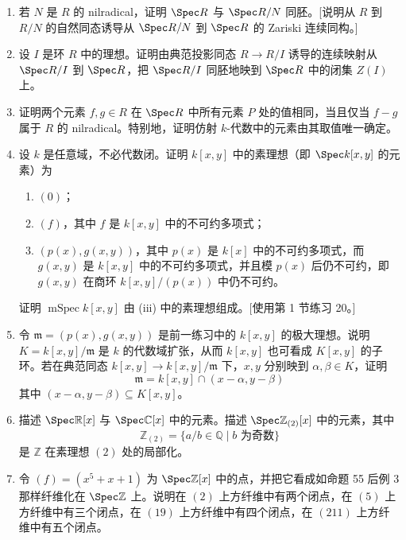 \begin{enumerate}[label=\arabic*.]
	\item 若 $N$ 是 $R$ 的 nilradical，证明 $\Spec R$ 与 $\Spec R/N$ 同胚。[说明从 $R$ 到 $R/N$ 的自然同态诱导从 $\Spec R/N$ 到 $\Spec R$ 的 Zariski 连续同构。]
	
	\item 设 $I$ 是环 $R$ 中的理想。证明由典范投影同态 $R\to R/I$ 诱导的连续映射从 $\Spec R/I$ 到 $\Spec R$，把 $\Spec R/I$ 同胚地映到 $\Spec R$ 中的闭集 $Z(I)$ 上。
	
	\item 证明两个元素 $f,g\in R$ 在 $\Spec R$ 中所有元素 $P$ 处的值相同，当且仅当 $f-g$ 属于 $R$ 的 nilradical。特别地，证明仿射 $k$-代数中的元素由其取值唯一确定。
	
	\item 设 $k$ 是任意域，不必代数闭。证明 $k[x,y]$ 中的素理想（即 $\Spec k[x,y]$ 的元素）为
	\begin{enumerate}[label=(\roman*)]
		\item $(0)$；
		\item $(f)$，其中 $f$ 是 $k[x,y]$ 中的不可约多项式；
		\item $(p(x),g(x,y))$，其中 $p(x)$ 是 $k[x]$ 中的不可约多项式，而 $g(x,y)$ 是 $k[x,y]$ 中的不可约多项式，并且模 $p(x)$ 后仍不可约，即 $g(x,y)$ 在商环 $k[x,y]/(p(x))$ 中仍不可约。
	\end{enumerate}
	证明 $\operatorname{mSpec}k[x,y]$ 由 (iii) 中的素理想组成。[使用第 1 节练习 20。]
	
	\item 令 $\mathfrak m=(p(x),g(x,y))$ 是前一练习中的 $k[x,y]$ 的极大理想。说明 $K=k[x,y]/\mathfrak m$ 是 $k$ 的代数域扩张，从而 $k[x,y]$ 也可看成 $K[x,y]$ 的子环。若在典范同态 $k[x,y]\to k[x,y]/\mathfrak m$ 下，$x,y$ 分别映到 $\alpha,\beta\in K$，证明
	\[
	\mathfrak m=k[x,y]\cap (x-\alpha,y-\beta)
	\]
	其中 $(x-\alpha,y-\beta)\subseteq K[x,y]$。
	
	\item 描述 $\Spec\mathbb R[x]$ 与 $\Spec\mathbb C[x]$ 中的元素。描述 $\Spec\mathbb Z_{(2)}[x]$ 中的元素，其中
	\[
	\mathbb Z_{(2)}=\{a/b\in\mathbb Q\mid b\text{ 为奇数}\}
	\]
	是 $\mathbb Z$ 在素理想 $(2)$ 处的局部化。
	
	\item 令 $(f)=(x^5+x+1)$ 为 $\Spec\mathbb Z[x]$ 中的点，并把它看成如命题 55 后例 3 那样纤维化在 $\Spec\mathbb Z$ 上。说明在 $(2)$ 上方纤维中有两个闭点，在 $(5)$ 上方纤维中有三个闭点，在 $(19)$ 上方纤维中有四个闭点，在 $(211)$ 上方纤维中有五个闭点。
	

\end{enumerate}

